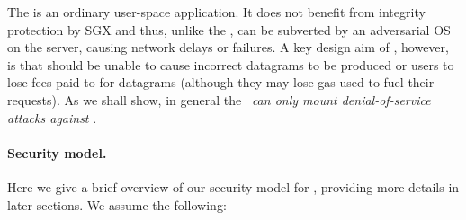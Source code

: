 The \medname is an ordinary user-space application. It does not benefit from integrity protection by SGX and thus, unlike the \encname, can be subverted by an adversarial OS on the \tc server, causing network delays or failures. A key design aim of \tc, however, is that \medname should be unable to cause incorrect datagrams to be produced or users to lose fees paid to \tc for datagrams (although they may lose gas used to fuel their requests). As we shall show, in general the \medname~{\em can only mount denial-of-service attacks against \tc}. 

\vspace{-2mm}
\paragraph{Security model.}

Here we give a brief overview of our security model for \tc, providing more details in later sections. We assume the following:

